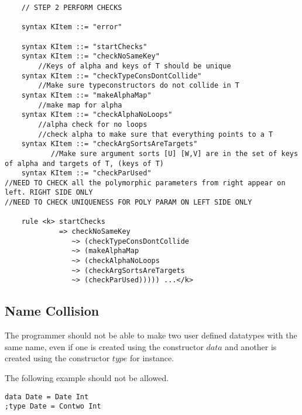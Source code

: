 \begin{lstlisting}
    // STEP 2 PERFORM CHECKS

    syntax KItem ::= "error"

    syntax KItem ::= "startChecks"
    syntax KItem ::= "checkNoSameKey"
        //Keys of alpha and keys of T should be unique
    syntax KItem ::= "checkTypeConsDontCollide"
        //Make sure typeconstructors do not collide in T
    syntax KItem ::= "makeAlphaMap"
        //make map for alpha
    syntax KItem ::= "checkAlphaNoLoops"
        //alpha check for no loops
        //check alpha to make sure that everything points to a T
    syntax KItem ::= "checkArgSortsAreTargets"
           //Make sure argument sorts [U] [W,V] are in the set of keys of alpha and targets of T, (keys of T)
    syntax KItem ::= "checkParUsed"
//NEED TO CHECK all the polymorphic parameters from right appear on left. RIGHT SIDE ONLY
//NEED TO CHECK UNIQUENESS FOR POLY PARAM ON LEFT SIDE ONLY

    rule <k> startChecks
             => checkNoSameKey
                ~> (checkTypeConsDontCollide
                ~> (makeAlphaMap
                ~> (checkAlphaNoLoops
                ~> (checkArgSortsAreTargets
                ~> (checkParUsed))))) ...</k>

\end{lstlisting}

\subsection{Name Collision}
The programmer should not be able to make two user defined datatypes with the same name, even if one is created using the constructor $data$ and another is created using the constructor $type$ for instance.

The following example should not be allowed.
\begin{lstlisting}
data Date = Date Int
;type Date = Contwo Int
\end{lstlisting}


